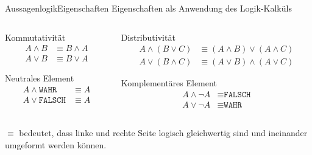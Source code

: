 \documentclass[xelatex,aspectratio=169]{beamer}
\begin{document}
\begin{frame}{Aussagenlogik}{Eigenschaften}
  \centering Eigenschaften als Anwendung des Logik-Kalküls
  \begin{columns}
    \begin{column}{0.5\textwidth}
      \begin{block}{Kommutativität}
        \vspace{-\baselineskip}
        \begin{align*}
          A \land B & \equiv B \land A \\
          A \lor B  & \equiv B \lor A
        \end{align*}
      \end{block}

      \begin{block}{Neutrales Element}
        \vspace{-\baselineskip}
        \begin{align*}
          A \land \texttt{WAHR}  & \equiv A \\
          A \lor \texttt{FALSCH} & \equiv A
        \end{align*}
      \end{block}
    \end{column}
    \begin{column}{0.5\textwidth}
      \begin{block}{Distributivität}
        \vspace{-\baselineskip}
        \begin{align*}
          A \land (B \lor C) & \equiv (A \land B) \lor (A \land C) \\
          A \lor (B \land C) & \equiv (A \lor B) \land (A \lor C)
        \end{align*}
      \end{block}
      \begin{block}{Komplementäres Element}
        \vspace{-\baselineskip}
        \begin{align*}
          A \land \lnot A & \equiv \texttt{FALSCH} \\
          A \lor \lnot A  & \equiv \texttt{WAHR}
        \end{align*}
      \end{block}
    \end{column}
  \end{columns}
  \begin{exampleblock}{}
    \( \equiv \) bedeutet, dass linke und rechte Seite logisch gleichwertig sind und ineinander umgeformt werden können.
  \end{exampleblock}
\end{frame}
\end{document}
